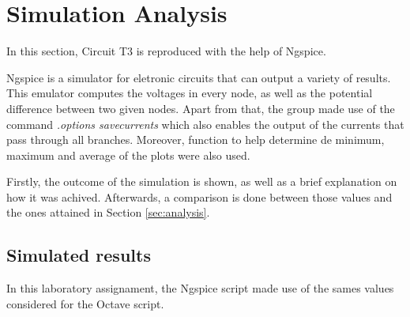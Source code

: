 
\section{Simulation Analysis}
\label{sec:simulation}



In this section, Circuit T3 is reproduced with the help of Ngspice.

Ngspice is a simulator for eletronic circuits that can output a variety of results.
This emulator computes the voltages in every node, as well as the potential difference
between two given nodes. Apart from that, the group made use of the command
{\em .options savecurrents} which also enables the output of the currents that pass
through all branches. Moreover, function to help determine de minimum, maximum and average
of the plots were also used.


Firstly, the outcome of the simulation is shown, as well as a brief explanation
on how it was achived. Afterwards, a comparison is done between those values and
the ones attained in Section \ref{sec:analysis}.




\subsection{Simulated results}
\label{subsec:sim_res}




In this laboratory assignament, the Ngspice script made use of the sames values considered for
the Octave script.


